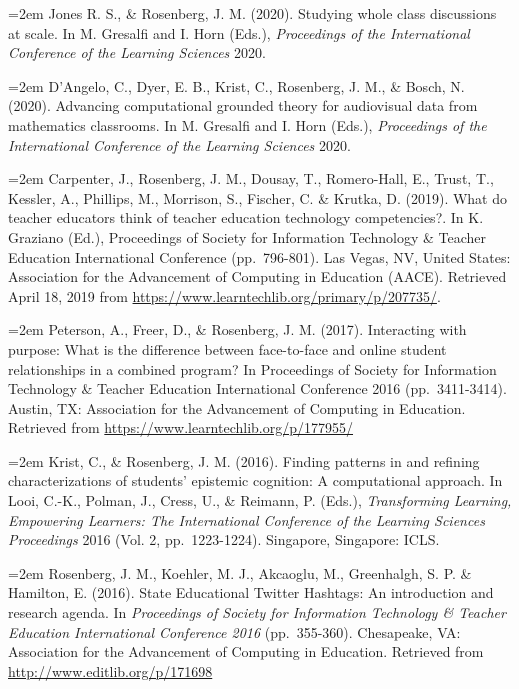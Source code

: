 \documentclass[
  11pt,
]{article}
\begin{document}
\hangindent=2em Jones R. S., \& Rosenberg, J. M. (2020). Studying whole
class discussions at scale. In M. Gresalfi and I. Horn (Eds.),
\emph{Proceedings of the International Conference of the Learning
Sciences} 2020.

\hangindent=2em D'Angelo, C., Dyer, E. B., Krist, C., Rosenberg, J. M.,
\& Bosch, N. (2020). Advancing computational grounded theory for
audiovisual data from mathematics classrooms. In M. Gresalfi and I. Horn
(Eds.), \emph{Proceedings of the International Conference of the
Learning Sciences} 2020.

\hangindent=2em Carpenter, J., Rosenberg, J. M., Dousay, T.,
Romero-Hall, E., Trust, T., Kessler, A., Phillips, M., Morrison, S.,
Fischer, C. \& Krutka, D. (2019). What do teacher educators think of
teacher education technology competencies?. In K. Graziano (Ed.),
Proceedings of Society for Information Technology \& Teacher Education
International Conference (pp.~796-801). Las Vegas, NV, United States:
Association for the Advancement of Computing in Education (AACE).
Retrieved April 18, 2019 from
\url{https://www.learntechlib.org/primary/p/207735/}.

\hangindent=2em Peterson, A., Freer, D., \& Rosenberg, J. M. (2017).
Interacting with purpose: What is the difference between face-to-face
and online student relationships in a combined program? In Proceedings
of Society for Information Technology \& Teacher Education International
Conference 2016 (pp.~3411-3414). Austin, TX: Association for the
Advancement of Computing in Education. Retrieved from
\url{https://www.learntechlib.org/p/177955/}

\hangindent=2em Krist, C., \& Rosenberg, J. M. (2016). Finding patterns
in and refining characterizations of students' epistemic cognition: A
computational approach. In Looi, C.-K., Polman, J., Cress, U., \&
Reimann, P. (Eds.), \emph{Transforming Learning, Empowering Learners:
The International Conference of the Learning Sciences Proceedings} 2016
(Vol. 2, pp.~1223-1224). Singapore, Singapore: ICLS.

\hangindent=2em Rosenberg, J. M., Koehler, M. J., Akcaoglu, M.,
Greenhalgh, S. P. \& Hamilton, E. (2016). State Educational Twitter
Hashtags: An introduction and research agenda. In \emph{Proceedings of
Society for Information Technology \& Teacher Education International
Conference 2016} (pp.~355-360). Chesapeake, VA: Association for the
Advancement of Computing in Education. Retrieved from
\url{http://www.editlib.org/p/171698}
\end{document}
